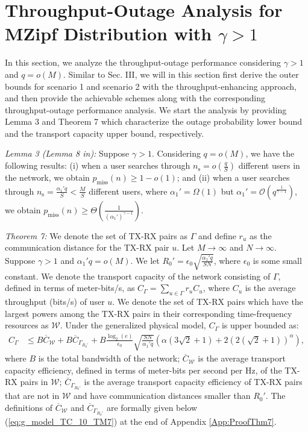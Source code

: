 \documentclass[journal,draftclsnofoot,onecolumn,12pt,twoside]{IEEEtran}
\begin{document}
\section{Throughput-Outage Analysis for MZipf Distribution with $\gamma>1$}

\label{Sec:Out_Bound_Gen_gg1}

In this section, we analyze the throughput-outage performance considering $\gamma>1$ and $q=o(M)$. Similar to Sec. III, we will in this section first derive the outer bounds for scenario 1 and scenario 2 with the throughput-enhancing approach, and then provide the achievable schemes along with the corresponding throughput-outage performance analysis. We start the analysis by providing Lemma 3 and Theorem 7 which characterize the outage probability lower bound and the transport capacity upper bound, respectively.

{\em Lemma 3 (Lemma 8 in\cite{lee2020optimal}):} Suppose $\gamma>1$. Considering $q=o(M)$, we have the following results: (i) when a user searches through $n_{\text{s}}=o\left(\frac{q}{S}\right)$ different users in the network, we obtain $p_{\text{miss}}(n)\geq 1-o(1)$; and (ii) when a user searches through $n_{\text{s}}=\frac{\alpha_1' q}{S}<\frac{M}{S}$ different users, where $\alpha_1'=\Omega\left(1\right)$ but $\alpha_1'=\mathcal{O}\left(q^{\frac{1}{\gamma-1}}\right)$, we obtain $p_{\text{miss}}(n)\geq\Theta\left(\frac{1}{(\alpha_1')^{\gamma-1}}\right)$.

{\em Theorem 7:} We denote the set of TX-RX pairs as $\Gamma$ and define $r_u$ as the communication distance for the TX-RX pair $u$. Let $M\to\infty$ and $N\to\infty$. Suppose $\gamma>1$ and $\alpha_1'q=o(M)$. We let $R_0'=\epsilon_0\sqrt{\frac{\alpha_1'q}{SN}}$, where $\epsilon_0$ is some small constant. We denote the transport capacity of the network consisting of $\Gamma$, defined in terms of meter-bits/s, as $C_{\Gamma}=\sum_{u\in\Gamma}r_uC_u$, where $C_u$ is the average throughput (bits/s) of user $u$. We denote the set of TX-RX pairs which have the largest powers among the TX-RX pairs in their corresponding time-frequency resources as $\mathcal{W}$. Under the generalized physical model, $C_{\Gamma}$ is upper bounded as:
\begin{equation}
\begin{aligned}\label{eq:g_model_TC_Thm_gg1}
C_{\Gamma}&\leq B\overline{C}_{\mathcal{W}}+B\overline{C}_{\Gamma_{R_0'}}+B\frac{\log_2(e)}{\epsilon_0}\sqrt{\frac{SN}{\alpha_1'q}}\left(\alpha\left(3\sqrt{2}+1\right)+2(2(\sqrt{2}+1))^{\alpha}\right),
\end{aligned}
\end{equation}
where $B$ is the total bandwidth of the network; $\overline{C}_{\mathcal{W}}$ is the average transport capacity efficiency, defined in terms of meter-bits per second per Hz, of the TX-RX pairs in $\mathcal{W}$; $\overline{C}_{\Gamma_{R_0'}}$ is the average transport capacity efficiency of TX-RX pairs that are not in $\mathcal{W}$ and have communication distances smaller than $R_0'$. The definitions of $\overline{C}_{\mathcal{W}}$ and $\overline{C}_{\Gamma_{R_0'}}$ are formally given below (\ref{eq:g_model_TC_10_TM7}) at the end of Appendix \ref{App:ProofThm7}.
\end{document}
